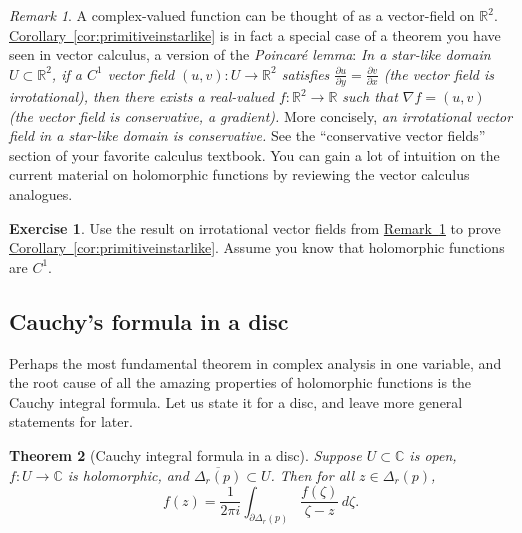 \documentclass[12pt,openany]{book}
\newcommand{\C}{{\mathbb{C}}}
\newcommand{\R}{{\mathbb{R}}}
\newcommand{\myindex}[1]{#1\index{#1}}
\newcommand{\myquote}[1]{``#1''}
\theoremstyle{plain}
\newtheorem{thm}{Theorem}[section]
\theoremstyle{remark}
\newtheorem{remark}[thm]{Remark}
\theoremstyle{definition}
\newenvironment{exbox}{%
    \def\FrameCommand{\vrule width 1pt \relax\hspace{10pt}}%
    \MakeFramed{\advance\hsize-\width\FrameRestore}%
}{%
    \endMakeFramed
}
\theoremstyle{exercise}
\newtheorem{exercise}{Exercise}[section]
\theoremstyle{example}
\newcommand{\corref}[1]{\hyperref[#1]{Corollary~\ref*{#1}}}
\newcommand{\remarkref}[1]{\hyperref[#1]{Remark~\ref*{#1}}}
\begin{document}
\begin{remark}\label{remark:irrotvfield}
A complex-valued function can be thought of as a vector-field on $\R^2$.
\corref{cor:primitiveinstarlike}
is in fact a special case of a theorem you have seen
in vector calculus, a version of the \emph{\myindex{Poincar\'e lemma}}:
\emph{In a star-like domain $U \subset \R^2$, if a
$C^1$ vector field $(u,v) \colon U \to \R^2$
satisfies $\frac{\partial u}{\partial y} = \frac{\partial v}{\partial x}$
(the vector field is \emph{irrotational}),
then there exists a real-valued $f \colon \R^2 \to \R$ such that
$\nabla f = (u,v)$ (the vector field is conservative, a gradient).}
More concisely, \emph{an irrotational vector field
in a star-like domain is conservative.}
See the \myquote{conservative vector fields} section
of your favorite calculus textbook.  You can gain a lot of
intuition on the current material on holomorphic functions by reviewing the
vector calculus analogues.
\end{remark}

\begin{exbox}
\begin{exercise}
Use the result on irrotational vector fields from
\remarkref{remark:irrotvfield} to prove 
\corref{cor:primitiveinstarlike}.
Assume you know that holomorphic functions are $C^1$.
\end{exercise}
\end{exbox}

\subsection{Cauchy's formula in a disc}

Perhaps the most fundamental theorem in complex analysis in one variable,
and the root cause of all the amazing properties of holomorphic functions
is the Cauchy integral formula.  Let us state it for a disc, and leave
more general statements for later.

\begin{thm}[Cauchy integral formula in a disc]
Suppose $U \subset \C$ is open, $f \colon U \to \C$ is holomorphic,
and $\overline{\Delta_r(p)} \subset U$.
Then for all $z \in \Delta_r(p)$,
\begin{equation*}
f(z)
=
\frac{1}{2\pi i}
\int_{\partial \Delta_r(p)}
\frac{f(\zeta)}{\zeta-z}
\,
d \zeta .
\end{equation*}
\end{thm}
\end{document}

